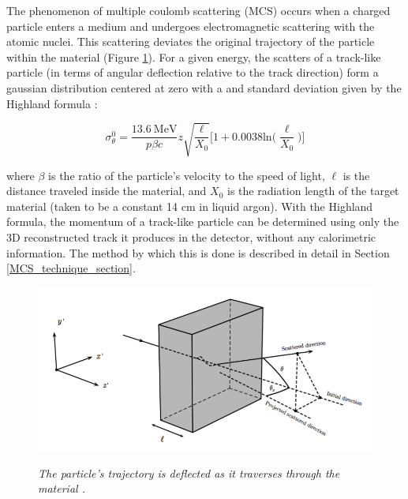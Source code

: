 The phenomenon of multiple coulomb scattering (MCS) occurs when a charged particle enters a medium and undergoes electromagnetic scattering with the atomic nuclei. This scattering deviates the original trajectory of the particle within the material (Figure \ref{mcs_nocap_fig}). For a given energy, the scatters of a track-like particle (in terms of angular deflection relative to the track direction) form a gaussian distribution centered at zero with a and standard deviation given by the Highland formula \cite{highland}: 

\begin{equation}
	\sigma_\theta^0=\frac{13.6\  \text{MeV}}{p\beta c}z\sqrt{\frac{\ell}{X_0}}\Big[1+0.0038\text{ln}\Big(\frac{\ell}{X_0}\Big)\Big]
\end{equation}\label{highland_eqtn}

\noindent where $\beta$ is the ratio of the particle's velocity to the speed of light, $\ell$ is the distance traveled inside the material, and $X_0$ is the radiation length of the target material (taken to be a constant 14 cm in liquid argon). With the Highland formula, the momentum of a track-like particle can be determined using only the 3D reconstructed track it produces in the detector, without any calorimetric information. The method by which this is done is described in detail in Section \ref{MCS_technique_section}.

\begin{figure}[ht!]
\centering
	\includegraphics[width=0.5\linewidth]{Figures/mcs_nocap.png} \\
\caption{\textit{The particle's trajectory is deflected as it traverses through the material \cite{leonidas1}.}}\label{mcs_nocap_fig}
\end{figure}